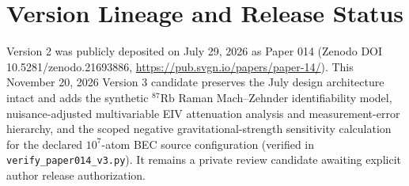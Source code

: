 \documentclass[
  american,
  11pt,
  letterpaper,
]{article}
\begin{document}
\section{Version Lineage and Release Status}\label{version-lineage-and-release-status}

Version 2 was publicly deposited on July 29, 2026 as Paper 014 (Zenodo DOI 10.5281/zenodo.21693886, \url{https://pub.svgn.io/papers/paper-14/}). This November 20, 2026 Version 3 candidate preserves the July design architecture intact and adds the synthetic \(^{87}\mathrm{Rb}\) Raman Mach--Zehnder identifiability model, nuisance-adjusted multivariable EIV attenuation analysis and measurement-error hierarchy, and the scoped negative gravitational-strength sensitivity calculation for the declared \(10^7\)-atom BEC source configuration (verified in \nolinkurl{verify_paper014_v3.py}). It remains a private review candidate awaiting explicit author release authorization.
\end{document}
